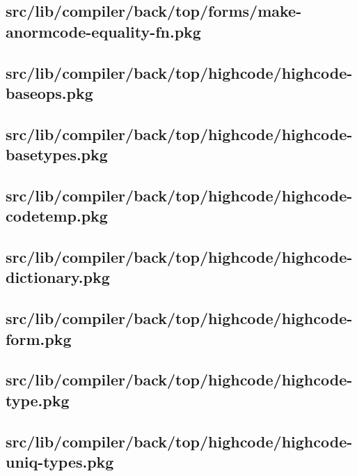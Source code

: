 \subsection{src/lib/compiler/back/top/forms/make-anormcode-equality-fn.pkg}


\subsection{src/lib/compiler/back/top/highcode/highcode-baseops.pkg}


\subsection{src/lib/compiler/back/top/highcode/highcode-basetypes.pkg}


\subsection{src/lib/compiler/back/top/highcode/highcode-codetemp.pkg}


\subsection{src/lib/compiler/back/top/highcode/highcode-dictionary.pkg}


\subsection{src/lib/compiler/back/top/highcode/highcode-form.pkg}


\subsection{src/lib/compiler/back/top/highcode/highcode-type.pkg}


\subsection{src/lib/compiler/back/top/highcode/highcode-uniq-types.pkg}



